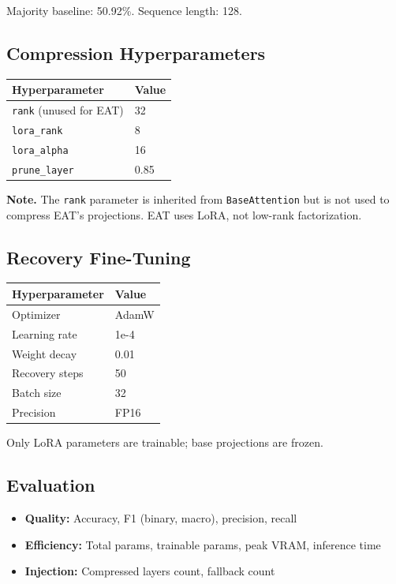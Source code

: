 Majority baseline: 50.92\%. Sequence length: 128.

\subsection{Compression Hyperparameters}

\begin{table}[H]
\centering
\small
\begin{tabular}{ll}
\toprule
\textbf{Hyperparameter} & \textbf{Value} \\
\midrule
\texttt{rank} (unused for EAT) & 32 \\
\texttt{lora\_rank} & 8 \\
\texttt{lora\_alpha} & 16 \\
\texttt{prune\_layer} & 0.85 \\
\bottomrule
\end{tabular}
\end{table}

\textbf{Note.} The \texttt{rank} parameter is inherited from \texttt{BaseAttention} but is not 
used to compress EAT's projections. EAT uses LoRA, not low-rank factorization.

\subsection{Recovery Fine-Tuning}

\begin{table}[H]
\centering
\small
\begin{tabular}{ll}
\toprule
\textbf{Hyperparameter} & \textbf{Value} \\
\midrule
Optimizer & AdamW \\
Learning rate & 1e-4 \\
Weight decay & 0.01 \\
Recovery steps & 50 \\
Batch size & 32 \\
Precision & FP16 \\
\bottomrule
\end{tabular}
\end{table}

Only LoRA parameters are trainable; base projections are frozen.

\subsection{Evaluation}

\begin{itemize}
\item \textbf{Quality:} Accuracy, F1 (binary, macro), precision, recall
\item \textbf{Efficiency:} Total params, trainable params, peak VRAM, inference time
\item \textbf{Injection:} Compressed layers count, fallback count

\end{itemize}
